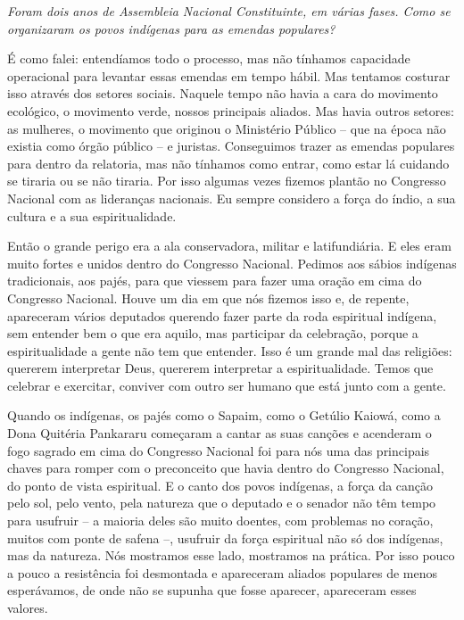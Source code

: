 \medskip

\noindent\emph{Foram dois anos de Assembleia Nacional Constituinte, em várias
fases. Como se organizaram os povos indígenas para as emendas
populares?}

É como falei: entendíamos todo o processo, mas não
tínhamos capacidade operacional para levantar essas emendas em tempo
hábil. Mas tentamos costurar isso através dos setores sociais. Naquele
tempo não havia a cara do movimento ecológico, o movimento verde, nossos
principais aliados. Mas havia outros setores: as mulheres, o movimento
que originou o Ministério Público -- que na época não existia como órgão
público -- e juristas. Conseguimos trazer as emendas populares para
dentro da relatoria, mas não tínhamos como entrar, como estar lá
cuidando se tiraria ou se não tiraria. Por isso algumas vezes fizemos
plantão no Congresso Nacional com as lideranças nacionais. Eu sempre
considero a força do índio, a sua cultura e a sua espiritualidade.

Então o grande perigo era a ala conservadora, militar e latifundiária. E
eles eram muito fortes e unidos dentro do Congresso Nacional. Pedimos
aos sábios indígenas tradicionais, aos pajés, para que viessem para
fazer uma oração em cima do Congresso Nacional. Houve um dia em que nós
fizemos isso e, de repente, apareceram vários deputados querendo fazer
parte da roda espiritual indígena, sem entender bem o que era aquilo,
mas participar da celebração, porque a espiritualidade a gente não tem
que entender. Isso é um grande mal das religiões: quererem interpretar
Deus, quererem interpretar a espiritualidade. Temos que celebrar e
exercitar, conviver com outro ser humano que está junto com a gente.

Quando os indígenas, os pajés como o Sapaim, como o Getúlio Kaiowá, como
a Dona Quitéria Pankararu começaram a cantar as suas canções e acenderam
o fogo sagrado em cima do Congresso Nacional foi para nós uma das
principais chaves para romper com o preconceito que havia dentro do
Congresso Nacional, do ponto de vista espiritual. E o canto dos povos
indígenas, a força da canção pelo sol, pelo vento, pela natureza que o
deputado e o senador não têm tempo para usufruir -- a maioria deles são
muito doentes, com problemas no coração, muitos com ponte de safena --,
usufruir da força espiritual não só dos indígenas, mas da natureza. Nós
mostramos esse lado, mostramos na prática. Por isso pouco a pouco a
resistência foi desmontada e apareceram aliados populares de menos
esperávamos, de onde não se supunha que fosse aparecer, apareceram esses
valores.

